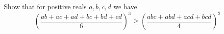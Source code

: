 Show that for positive reals $a, b, c, d$ we have
\[ \left(\dfrac{ab + ac + ad + bc + bd + cd}{6} \right)^3 \geq \left(\dfrac{abc + abd + acd + bcd}{4}\right)^2 \]